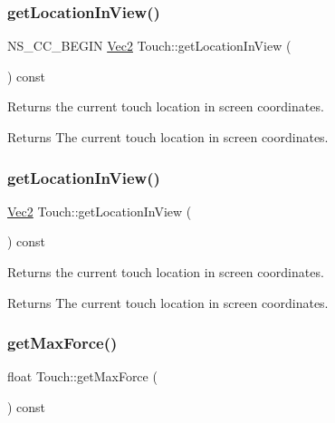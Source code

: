 \subsubsection{\texorpdfstring{get\+Location\+In\+View()}{getLocationInView()}\hspace{0.1cm}{\footnotesize\ttfamily [1/2]}}
{\footnotesize\ttfamily N\+S\+\_\+\+C\+C\+\_\+\+B\+E\+G\+IN \hyperlink{classVec2}{Vec2} Touch\+::get\+Location\+In\+View (\begin{DoxyParamCaption}{ }\end{DoxyParamCaption}) const}

Returns the current touch location in screen coordinates.

\begin{DoxyReturn}{Returns}
The current touch location in screen coordinates. 
\end{DoxyReturn}
\mbox{\label{classTouch_adf4ed41586532a805e391b2f1de5e9a9}} 
\subsubsection{\texorpdfstring{get\+Location\+In\+View()}{getLocationInView()}\hspace{0.1cm}{\footnotesize\ttfamily [2/2]}}
{\footnotesize\ttfamily \hyperlink{classVec2}{Vec2} Touch\+::get\+Location\+In\+View (\begin{DoxyParamCaption}{ }\end{DoxyParamCaption}) const}

Returns the current touch location in screen coordinates.

\begin{DoxyReturn}{Returns}
The current touch location in screen coordinates. 
\end{DoxyReturn}
\mbox{\label{classTouch_a4aa254ea9e7d9dba69439b295da0ccb0}} 
\subsubsection{\texorpdfstring{get\+Max\+Force()}{getMaxForce()}\hspace{0.1cm}{\footnotesize\ttfamily [1/2]}}
{\footnotesize\ttfamily float Touch\+::get\+Max\+Force (\begin{DoxyParamCaption}{ }\end{DoxyParamCaption}) const}

